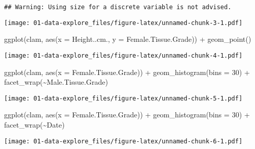 \documentclass[
]{article}
\newenvironment{Shaded}{\begin{snugshade}}{\end{snugshade}}
\newcommand{\AttributeTok}[1]{\textcolor[rgb]{0.77,0.63,0.00}{#1}}
\newcommand{\DecValTok}[1]{\textcolor[rgb]{0.00,0.00,0.81}{#1}}
\newcommand{\FunctionTok}[1]{\textcolor[rgb]{0.00,0.00,0.00}{#1}}
\newcommand{\NormalTok}[1]{#1}
\newcommand{\SpecialCharTok}[1]{\textcolor[rgb]{0.00,0.00,0.00}{#1}}
\begin{document}
\begin{verbatim}
## Warning: Using size for a discrete variable is not advised.
\end{verbatim}

\texttt{[image: 01-data-explore\_files/figure-latex/unnamed-chunk-3-1.pdf]}

\begin{Shaded}
\begin{Highlighting}[]
\FunctionTok{ggplot}\NormalTok{(clam, }\FunctionTok{aes}\NormalTok{(}\AttributeTok{x =}\NormalTok{ Height..cm., }\AttributeTok{y =}\NormalTok{ Female.Tissue.Grade)) }\SpecialCharTok{+}
  \FunctionTok{geom\_point}\NormalTok{()}
\end{Highlighting}
\end{Shaded}

\texttt{[image: 01-data-explore\_files/figure-latex/unnamed-chunk-4-1.pdf]}

\begin{Shaded}
\begin{Highlighting}[]
\FunctionTok{ggplot}\NormalTok{(clam, }\FunctionTok{aes}\NormalTok{(}\AttributeTok{x =}\NormalTok{ Female.Tissue.Grade)) }\SpecialCharTok{+}
  \FunctionTok{geom\_histogram}\NormalTok{(}\AttributeTok{bins =} \DecValTok{30}\NormalTok{) }\SpecialCharTok{+}
  \FunctionTok{facet\_wrap}\NormalTok{(}\SpecialCharTok{\textasciitilde{}}\NormalTok{Male.Tissue.Grade)}
\end{Highlighting}
\end{Shaded}

\texttt{[image: 01-data-explore\_files/figure-latex/unnamed-chunk-5-1.pdf]}

\begin{Shaded}
\begin{Highlighting}[]
\FunctionTok{ggplot}\NormalTok{(clam, }\FunctionTok{aes}\NormalTok{(}\AttributeTok{x =}\NormalTok{ Female.Tissue.Grade)) }\SpecialCharTok{+}
  \FunctionTok{geom\_histogram}\NormalTok{(}\AttributeTok{bins =} \DecValTok{30}\NormalTok{) }\SpecialCharTok{+}
  \FunctionTok{facet\_wrap}\NormalTok{(}\SpecialCharTok{\textasciitilde{}}\NormalTok{Date)}
\end{Highlighting}
\end{Shaded}

\texttt{[image: 01-data-explore\_files/figure-latex/unnamed-chunk-6-1.pdf]}
\end{document}
